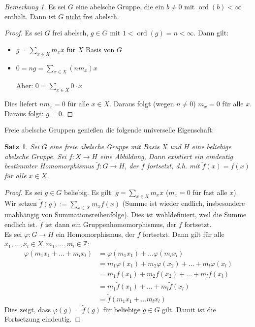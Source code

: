 \documentclass[12pt]{scrartcl} %
\newtheorem{thm}{Satz}
\theoremstyle{definition}
\theoremstyle{remark}
\newtheorem*{nb}{Bemerkung}
\begin{document}
\begin{nb}
  Es sei $G$ eine abelsche Gruppe, die ein $b \neq 0 $ mit $\operatorname{ord}(b) < \infty$ enthält. Dann ist $G$ \underline{nicht} frei abelsch.
\end{nb}

\begin{proof}
  Es sei $G$ frei abelsch, $g \in G$ mit $ 1 < \operatorname{ord}(g) = n < \infty$. Dann gilt:
  \begin{itemize}
    \item $g = \sum_{x \in X} m_x x $ für $X$ Basis von $G$ 
    \item $0 = ng = \sum_{x \in X} (n m_x) x $
    \item[Aber:] $0 = \sum_{x \in X} 0 \cdot x$
  \end{itemize}
  Dies liefert $n m_x = 0$ für alle $x \in X$. Daraus folgt (wegen $n \neq 0$) $m_x = 0$ für alle $x$. Daraus folgt: $g = 0$.
\end{proof}

Freie abelsche Gruppen genießen die folgende universelle Eigenschaft:  

\begin{thm}
  Sei $G$ eine freie abelsche Gruppe mit Basis $X$ und $H$ eine beliebige abelsche Gruppe. Sei $f : X \to H$ eine Abbildung, Dann existiert ein eindeutig bestimmter Homomorphismus $\tilde{f}: G \to H$, der $f$ fortsetzt, d.h. mit $\tilde{f}(x) = f(x)$ für alle $x \in X$.
\end{thm}
\begin{proof}
  Es sei $g \in G$ beliebig. Es gilt: $g = \sum_{x \in X}m_x x$ ($ m_x = 0$ für fast alle $x$). \\
  Wir setzen $\tilde{f}(g) := \sum_{x \in X} m_x f(x)$ (Summe ist wieder endlich, insbesondere unabhängig von Summationsreihenfolge). Dies ist wohldefiniert, weil die Summe endlich ist. $\tilde{f}$ ist dann ein Gruppenhomomorphismus, der $f$ fortsetzt.  \\
  Es sei $\varphi : G \to H$ ein Homomorphismus, der $f$ fortsetzt. Dann gilt für alle $x_1,\dots,x_l \in X, m_1,\dots,m_l \in \mathbb{Z}$: 
  \begin{align*}
  \varphi(m_1 x_1 + \dots + m_l x_l) 
  &= \varphi( m_1 x_1) + \dots \varphi( m_l x_l ) \\
  &= m_1 \varphi(x_1) + m_2 \varphi(x_2) + \dots + m_l \varphi(x_l) \\
  &= m_1 f(x_1) + m_2 f(x_2) + \dots + m_l f(x_l) \\
  &= m_1 \tilde{f}(x_1) + \dots + m_l \tilde{f}(x_l)\\
  &= \tilde{f}( m_1 x_1 + \dots m_l x_l)
  \end{align*}
  Dies zeigt, dass $\varphi(g) = \tilde{f}(g) $ für beliebige $g \in G$ gilt. Damit ist die Fortsetzung eindeutig.
\end{proof} 
\end{document}
